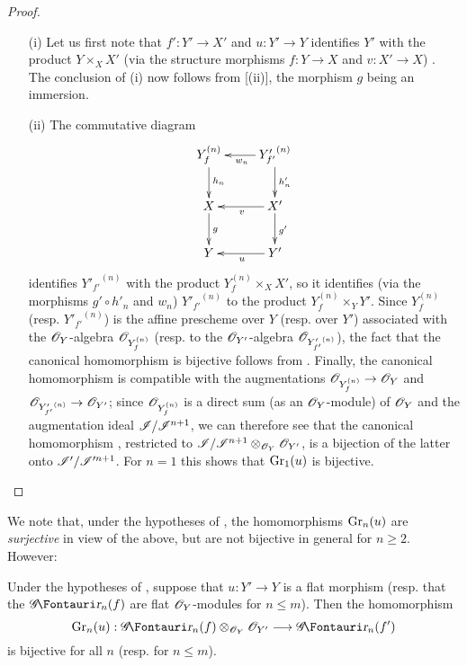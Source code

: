 \begin{proof}
\medskip\noindent
\begin{enumerate}
  \item[(i)] Let us first note that $f': Y' \to X'$ and $u: Y' \to Y$  identifies $Y'$ with the product $Y \times_X X'$ (via the structure morphisms $f:Y \to X$ and $v: X' \to X$) .
  The conclusion of (i) now follows from [(ii)], the morphism $g$ being an immersion.
  \item[(ii)] The commutative diagram
  \[
  \xymatrix{
    Y_f^{(n)} \ar[d]^{h_n}  & {Y'_{f'}}^{(n)} \ar[d]^-{h'_n} \ar[l]^{w_n}\\  
    X         \ar[d]^{g}    & X'              \ar[d]^{g'} \ar[l]^v \\  
    Y                       & Y' \ar[l]^u \\  
  }
  \]
  identifies ${Y'_{f'}}^{(n)}$ with the product $Y_f^{(n)} \times_X X'$, so  it identifies (via the morphisms $g'\circ h'_n$ and $w_n$) ${Y'_{f'}}^{(n)}$ to the product $Y_f^{(n)} \times_Y Y'$.
  Since $Y_f^{(n)}$ (resp. ${Y'_{f'}}^{(n)}$) is the affine prescheme over $Y$ (resp. over $Y'$) associated with the $\mathscr{O}_Y$-algebra $\mathscr{O}_{Y_f^{(n)}}$ (resp. to the $\mathscr{O}_{Y'}$-algebra $\mathscr{O}_{{Y'_{f'}}^{(n)}}$), the fact that the canonical homomorphism  is bijective follows from .
  Finally, the canonical homomorphism  is compatible with the augmentations $\sh{O}_{Y_f^{(n)}} \to \sh{O}_Y$ and $\sh{O}_{{Y'_{f'}}^{(n)}} \to \sh{O}_{Y'}$;
  since $\mathscr{O}_{Y_f^{(n)}}$ is a direct sum (as an $\mathscr{O}_Y$-module) of $\mathscr{O}_Y$ and the augmentation ideal $\mathscr{I}/\mathscr{I}^{n+1}$, we can therefore see that the canonical homomorphism , restricted to $\mathscr{I}/\mathscr{I}^{n+1} \otimes_{\mathscr{O}_Y} \mathscr{O}_{Y'}$, is a bijection of the latter onto $\mathscr{I}'/\mathscr{I}'^{n+1}$. For $n=1$ this shows that $\operatorname{Gr}_1(u)$ is bijective.
\end{enumerate}
\end{proof}

We note that, under the hypotheses of , the homomorphisms $\operatorname{Gr}_n(u)$ are \emph{surjective} in view of the above, but are not bijective in general for $n \geq 2$.
However:

\begin{corollary}[16.2.4]
\label{IV.16.2.4}
Under the hypotheses of , suppose that $u: Y' \to Y$ is a flat morphism (resp. that the $\shGr_n(f)$ are flat $\mathscr{O}_Y$-modules for $n \leq m$).
Then the homomorphism 
\[
  \Gr_n(u):\shGr_n(f) \otimes_{\sh{O}_Y}\sh{O}_{Y'} \to \shGr_n(f')
\]
is bijective for all $n$ (resp. for $n \leq m$).
\end{corollary}


